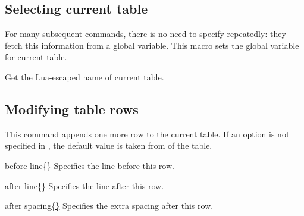 \documentclass{l3doc}
\newcommand{\optiondf}[1]{\uline{#1}}
\begin{document}
\begin{documentation}
\begin{function}{\LPTNewTable}
\end{function}

\subsection{Selecting current table}

\begin{function}{\LPTSetCurrentTable}
    \begin{syntax}
         
    \end{syntax}
    
    For many subsequent commands, there is no need to specify  repeatedly: they fetch this information from a global variable. This macro sets the global variable for current table.
\end{function}

\begin{function}{\LPTGetCurrentTable}
    \begin{syntax}
    \end{syntax}
    
    Get the Lua-escaped name of current table.
\end{function}

\subsection{Modifying table rows}

\begin{function}{\LPTAddRow}

    \begin{syntax}
         
    \end{syntax}
    
    This command appends one more row to the current table. If an option is not specified in , the default value is taken from  of the table.
    
    \begin{optiondetail}{}
        \begin{optionitem}{before line}{\optiondf{\{\}}}
            Specifies the line before this row.
        \end{optionitem}
        \begin{optionitem}{after line}{\optiondf{\{\}}}
            Specifies the line after this row.
        \end{optionitem}
        \begin{optionitem}{after spacing}{\optiondf{\{\}}}
            Specifies the extra spacing after this row.
        \end{optionitem}
    \end{optiondetail}


\end{function}
\end{documentation}
\end{document}
